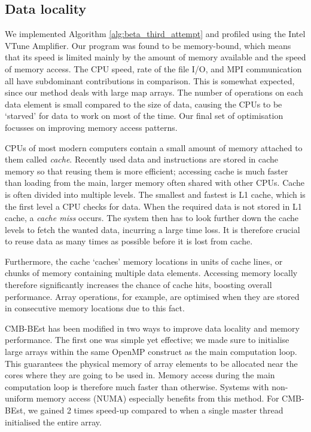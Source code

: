 \subsection{Data locality}

We implemented Algorithm \ref{alg:beta_third_attempt} and profiled using the Intel VTune Amplifier. Our program was found to be memory-bound, which means that its speed is limited mainly by the amount of memory available and the speed of memory access. The CPU speed, rate of the file I/O, and MPI communication all have subdominant contributions in comparison. This is somewhat expected, since our method deals with large map arrays. The number of operations on each data element is small compared to the size of data, causing the CPUs to be `starved' for data to work on most of the time. Our final set of optimisation focusses on improving memory access patterns.

CPUs of most modern computers contain a small amount of memory attached to them called \textit{cache}. Recently used data and instructions are stored in cache memory so that reusing them is more efficient; accessing cache is much faster than loading from the main, larger memory often shared with other CPUs. Cache is often divided into multiple levels. The smallest and fastest is L1 cache, which is the first level a CPU checks for data. When the required data is not stored in L1 cache, a \textit{cache miss} occurs. The system then has to look further down the cache levels to fetch the wanted data, incurring a large time loss. It is therefore crucial to reuse data as many times as possible before it is lost from cache.

Furthermore, the cache `caches' memory locations in units of cache lines, or chunks of memory containing multiple data elements. Accessing memory locally therefore significantly increases the chance of cache hits, boosting overall performance. Array operations, for example, are optimised when they are stored in consecutive memory locations due to this fact.

CMB-BEst has been modified in two ways to improve data locality and memory performance. The first one was simple yet effective; we made sure to initialise large arrays within the same OpenMP construct as the main computation loop. This guarantees the physical memory of array elements to be allocated near the cores where they are going to be used in. Memory access during the main computation loop is therefore much faster than otherwise. Systems with non-uniform memory access (NUMA) especially benefits from this method. For CMB-BEst, we gained 2 times speed-up compared to when a single master thread initialised the entire array.

